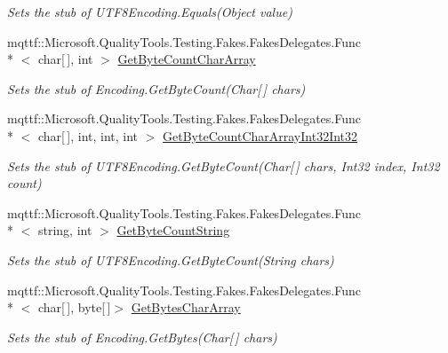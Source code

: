 \begin{DoxyCompactItemize}
\begin{DoxyCompactList}\small\item\em Sets the stub of U\-T\-F8\-Encoding.\-Equals(\-Object value)\end{DoxyCompactList}\item 
mqttf\-::\-Microsoft.\-Quality\-Tools.\-Testing.\-Fakes.\-Fakes\-Delegates.\-Func\\*
$<$ char\mbox{[}$\,$\mbox{]}, int $>$ \hyperlink{class_system_1_1_text_1_1_fakes_1_1_stub_u_t_f8_encoding_a51b19647ea071e6bedddb1293f53d0ee}{Get\-Byte\-Count\-Char\-Array}
\begin{DoxyCompactList}\small\item\em Sets the stub of Encoding.\-Get\-Byte\-Count(\-Char\mbox{[}$\,$\mbox{]} chars)\end{DoxyCompactList}\item 
mqttf\-::\-Microsoft.\-Quality\-Tools.\-Testing.\-Fakes.\-Fakes\-Delegates.\-Func\\*
$<$ char\mbox{[}$\,$\mbox{]}, int, int, int $>$ \hyperlink{class_system_1_1_text_1_1_fakes_1_1_stub_u_t_f8_encoding_ac29d61bdf1c51f9edbd8fb2d22f89d8b}{Get\-Byte\-Count\-Char\-Array\-Int32\-Int32}
\begin{DoxyCompactList}\small\item\em Sets the stub of U\-T\-F8\-Encoding.\-Get\-Byte\-Count(\-Char\mbox{[}$\,$\mbox{]} chars, Int32 index, Int32 count)\end{DoxyCompactList}\item 
mqttf\-::\-Microsoft.\-Quality\-Tools.\-Testing.\-Fakes.\-Fakes\-Delegates.\-Func\\*
$<$ string, int $>$ \hyperlink{class_system_1_1_text_1_1_fakes_1_1_stub_u_t_f8_encoding_a93f570c145ee28d86744276cc9f616e7}{Get\-Byte\-Count\-String}
\begin{DoxyCompactList}\small\item\em Sets the stub of U\-T\-F8\-Encoding.\-Get\-Byte\-Count(\-String chars)\end{DoxyCompactList}\item 
mqttf\-::\-Microsoft.\-Quality\-Tools.\-Testing.\-Fakes.\-Fakes\-Delegates.\-Func\\*
$<$ char\mbox{[}$\,$\mbox{]}, byte\mbox{[}$\,$\mbox{]}$>$ \hyperlink{class_system_1_1_text_1_1_fakes_1_1_stub_u_t_f8_encoding_a4fa08965c34482fdc2685ce8498587e4}{Get\-Bytes\-Char\-Array}
\begin{DoxyCompactList}\small\item\em Sets the stub of Encoding.\-Get\-Bytes(\-Char\mbox{[}$\,$\mbox{]} chars)\end{DoxyCompactList}\item 

\end{DoxyCompactItemize}

